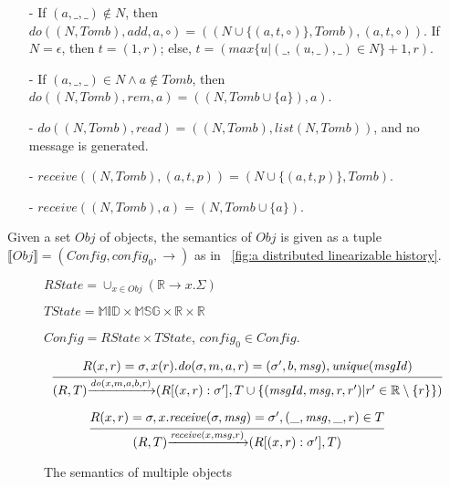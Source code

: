 \begin{example}[RGA]
\begin{itemize}
\item[-] If $(a,\_,\_) \notin N$, then $\mathit{do}((N,\mathit{Tomb}),\mathit{add},a,\circ) = ((N \cup \{ (a,t,\circ) \},\mathit{Tomb}),(a,t,\circ))$. If $N = \epsilon$, then $t = (1,r)$; else, $t = (\mathit{max}\{ u \vert (\_,(u,\_),\_) \in N \}+1,r)$. 

\item[-] If $(a,\_,\_) \in N \wedge a \notin \mathit{Tomb}$, then $\mathit{do}((N,\mathit{Tomb}),\mathit{rem},a) = ((N,\mathit{Tomb} \cup \{ a \} ),a)$.

\item[-] $\mathit{do}((N,\mathit{Tomb}),\mathit{read}) = ((N,\mathit{Tomb}),\mathit{list}(N,\mathit{Tomb}))$, and no message is generated.

\item[-] $\mathit{receive}((N,\mathit{Tomb}),(a,t,p)) = (N \cup \{ (a,t,p) \},\mathit{Tomb})$.

\item[-] $\mathit{receive}((N,\mathit{Tomb}),a) = (N,\mathit{Tomb} \cup \{ a \})$.
\end{itemize}
\end{example}

 Given a set $\mathit{Obj}$ of objects, the semantics of $\mathit{Obj}$ is given as a tuple $\llbracket \mathit{Obj} \rrbracket = (\mathit{Config},\mathit{config}_0,\rightarrow)$ as in \figurename~\ref{fig:a distributed linearizable history}.

\begin{figure}[ht]
$\mathit{RState} = \cup_{x \in \mathit{Obj}} (\mathbb{R} \rightarrow x.\Sigma)$

$\mathit{TState} = \mathbb{MID} \times \mathbb{MSG} \times \mathbb{R} \times \mathbb{R}$

$\mathit{Config} = \mathit{RState} \times \mathit{TState}$, $\mathit{config}_0 \in \mathit{Config}$. 


\[
\begin{array}{l c}
\bigfrac{ R(x,r) = \sigma, x(r).\mathit{do}(\sigma,m,a,r) = (\sigma',b,\mathit{msg}), \mathit{unique}(\mathit{msgId}) }
{ (R,T) {\xrightarrow{\mathit{do}(x,m,a,b,r)}} (R[(x,r):\sigma'],T \cup \{ (\mathit{msgId},\mathit{msg},r,r') \vert r' \in \mathbb{R} \setminus \{ r \} \}) }
\end{array}
\]

\[
\begin{array}{l c}
\bigfrac{ R(x,r) = \sigma, x.\mathit{receive}(\sigma,\mathit{msg}) = \sigma',(\_,\mathit{msg},\_,r) \in T}
{ (R,T) {\xrightarrow{\mathit{receive}(x,\mathit{msg},r)}} (R[(x,r):\sigma'],T) }
\end{array}
\]
\caption{The semantics of multiple objects}
\label{fig:the semantics of multiple objects}
\end{figure}

